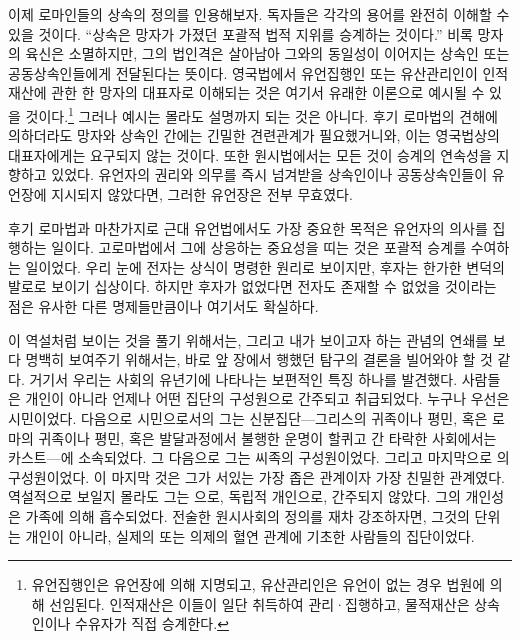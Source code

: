이제 로마인들의 상속의 정의를 인용해보자.
독자들은 각각의 용어를 완전히 이해할 수 있을 것이다.
``상속은 망자가 가졌던 포괄적 법적 지위를 승계하는 것이다.''
비록 망자의 육신은 소멸하지만,
그의 법인격은 살아남아 그와의 동일성이
이어지는 상속인 또는 공동상속인들에게
전달된다는 뜻이다.
영국법에서 유언집행인 또는
유산관리인이
인적재산에 관한 한 망자의 대표자로 이해되는 것은
여기서 유래한 이론으로 예시될 수 있을 것이다.\footnote{유언집행인은
유언장에 의해 지명되고, 유산관리인은 유언이 없는 경우 법원에 의해
선임된다. 인적재산은 이들이 일단 취득하여 관리^^b7집행하고,
물적재산은 상속인이나 수유자가 직접 승계한다.}
그러나 예시는 몰라도 설명까지 되는 것은 아니다.
후기 로마법의 견해에 의하더라도
망자와 상속인 간에는 긴밀한 견련관계가 필요했거니와,
이는 영국법상의 대표자에게는 요구되지 않는 것이다.
또한 원시법에서는 모든 것이 승계의 연속성을 지향하고 있었다.
유언자의 권리와 의무를 즉시 넘겨받을 상속인이나 공동상속인들이
유언장에
지시되지 않았다면,
그러한 유언장은 전부 무효였다.

후기 로마법과 마찬가지로 근대 유언법에서도
가장 중요한 목적은 유언자의 의사를 집행하는 일이다.
고로마법에서 그에 상응하는 중요성을 띠는 것은
포괄적 승계를 수여하는 일이었다.
우리 눈에 전자는 상식이 명령한 원리로 보이지만,
후자는 한가한 변덕의 발로로 보이기 십상이다.
하지만 후자가 없었다면 전자도 존재할 수 없었을 것이라는 점은
유사한 다른 명제들만큼이나 여기서도 확실하다.

이 역설처럼 보이는 것을 풀기 위해서는,
그리고 내가 보이고자 하는 관념의 연쇄를 보다 명백히 보여주기 위해서는,
바로 앞 장에서 행했던 탐구의 결론을 빌어와야 할 것 같다.
거기서 우리는 사회의 유년기에 나타나는 보편적인 특징 하나를 발견했다.
사람들은 개인이 아니라 언제나 어떤 집단의 구성원으로
간주되고 취급되었다.
누구나 우선은 시민이었다.
다음으로 시민으로서의 그는
신분집단---그리스의 귀족이나 평민,
혹은 로마의 귀족이나 평민,
혹은 발달과정에서 불행한 운명이 할퀴고 간 타락한 사회에서는
카스트---에 소속되었다.
그 다음으로 그는 씨족의 구성원이었다.
그리고 마지막으로 의 구성원이었다.
이 마지막 것은 그가 서있는 가장 좁은 관계이자 가장 친밀한 관계였다.
역설적으로 보일지 몰라도 그는 으로,
독립적 개인으로, 간주되지 않았다.
그의 개인성은 가족에 의해 흡수되었다.
전술한 원시사회의 정의를 재차 강조하자면,
그것의 단위는 개인이 아니라,
실제의 또는 의제의 혈연 관계에 기초한 사람들의 집단이었다.

